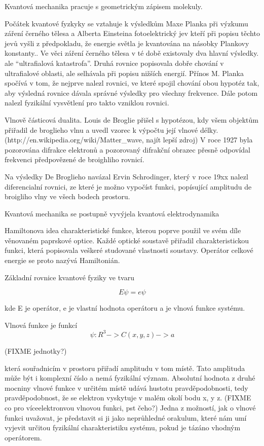 \documentclass[
  color, %
  table, %
  lof,   %
  lot,   %
]{fithesis3}
\begin{document}
Kvantová mechanika pracuje s geometrickým zápisem molekuly.


Počátek kvantové fyzkyky se vztahuje k výsledkům Maxe Planka při výzkumu záření černého tělesa a Alberta Einsteina fotoelektrický jev kteří při popisu těchto jevů vyšli z předpokladu, že energie světla je kvantována na násobky Plankovy konstanty.. Ve věci záření černého tělesa v té době existovaly dva hlavní výsledky.  ale “ultrafialová katastrofa”. Druhá rovnice popisovala dobře chování v ultrafialové oblasti, ale selhávala při popisu nižších energií. Přínos M. Planka spočívá v tom, že nejprve nalezl rovnici, ve které spojil chování obou hypotéz tak, aby výsledná rovnice dávala správné výsledky pro všechny frekvence. Dále potom nalezl fyzikální vysvětlení pro takto vzniklou rovnici. 

Vlnově částicová dualita. Louis de Broglie přišel s hypotézou, kdy všem objektům přiřadil de broglieho vlnu a uvedl vzorec k výpočtu její vlnové délky. (http://en.wikipedia.org/wiki/Matter_wave, najít lepší zdroj) V roce 1927 byla pozorována difrakce elektronů a pozorovaný difrakční obrazec přesně odpovídal frekvenci předpovězené de broighliho rovnicí.

Na výsledky De Broglieho navázal Ervin Schrodinger, který v roce 19xx nalezl diferencialní rovnici, ze které je možno vypočíst funkci, popísující amplitudu de broigliho vlny ve všech bodech prostoru.

Kvantová mechanika se postupně vyvýjela 
kvantová elektrodynamika

Hamiltonova idea charakteristické funkce, kterou poprve použil ve svém díle věnovaném paprskové optice. Každé optické soustavě přiřadil charakteristickou funkci, která popisovala veškeré studované vlastnosti soustavy. Operátor celkové energie se proto nazývá Hamiltonián.


Základní rovnice kvantové fyziky ve tvaru

\[E \psi = e \psi\]

kde E je operátor, e je vlastní hodnota operátoru a \psi je vlnová funkce systému.

Vlnová funkce je funkcí 
\[\psi : R^3 -> C
(x, y, z) -> a\]

(FIXME jednotky?)

která souřadnicím v prostoru přiřadí amplitudu v tom místě. Tato amplituda může být i komplexní číslo a nemá fyzikální význam. Absolutní hodnota z druhé mocniny vlnové funkce v určitém místě udává hustotu pravděpodobnosti, tedy pravděpodobnost, že se elektron vyskytuje v malém okolí bodu x, y z.  (FIXME co pro víceelektronvou vlnovou funkci, pst čeho?)
Jedna z možností, jak o vlnové funkci uvažovat, je představit si ji jako neprůhledné orakulum, které nám umí vyjevit určitou fyzikální charakteristiku systému, pokud je tázáno vhodným operátorem.
\end{document}
